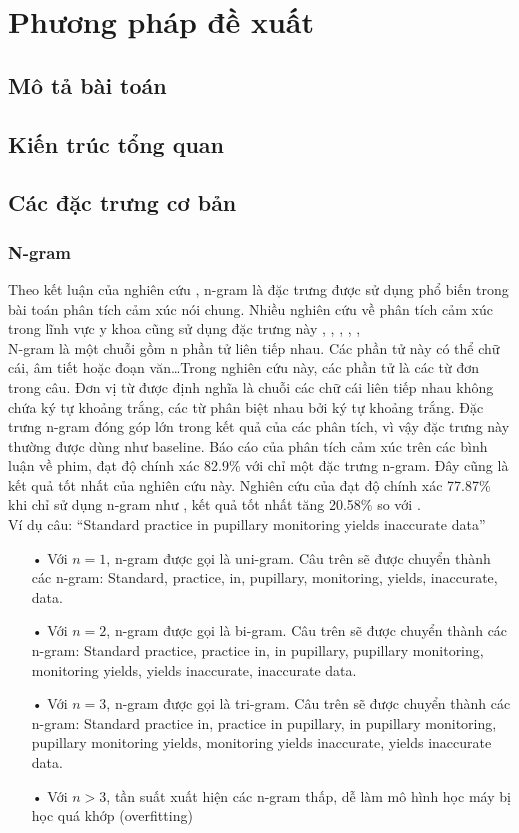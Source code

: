 \section{Phương pháp đề xuất}
\subsection{Mô tả bài toán}
\subsection{Kiến trúc tổng quan}
\subsection{Các đặc trưng cơ bản}
\subsubsection*{N-gram}
Theo kết luận của nghiên cứu \cite{chandrakala2012opinion}, n-gram là đặc trưng được sử dụng phổ biến trong bài toán phân tích cảm xúc nói chung. Nhiều nghiên cứu về phân tích cảm xúc trong lĩnh vực y khoa cũng sử dụng đặc trưng này \cite{pang2002thumbs}, \cite{niu2005analysis}, \cite{sarker2011outcome}, \cite{niu2006using}, \cite{pestian2012sentie}, \cite{xia09improving} \\

N-gram là một chuỗi gồm n phần tử liên tiếp nhau. Các phần tử này có thể chữ cái, âm tiết hoặc đoạn văn\ldots Trong nghiên cứu này, các phần tử là các từ đơn trong câu. Đơn vị từ được định nghĩa là chuỗi các chữ cái liên tiếp nhau không chứa ký tự khoảng trắng, các từ phân biệt nhau bởi ký tự khoảng trắng. Đặc trưng n-gram đóng góp lớn trong kết quả của các phân tích, vì vậy đặc trưng này thường được dùng như baseline. Báo cáo  của \cite{pang2002thumbs} phân tích cảm xúc trên các bình luận về phim, đạt độ chính xác 82.9\% với chỉ một đặc trưng n-gram. Đây cũng là kết quả tốt nhất của nghiên cứu này. Nghiên cứu của \cite{niu2005analysis} đạt độ chính xác 77.87\% khi chỉ sử dụng n-gram như , kết quả tốt nhất tăng 20.58\% so với . \\

Ví dụ câu: ``Standard practice in pupillary monitoring yields inaccurate data''
\begin{itemize}
\item[•]Với $n=1$, n-gram được gọi là uni-gram. Câu trên sẽ được chuyển thành các n-gram: Standard, practice, in, pupillary, monitoring, yields, inaccurate, data.
\item[•]Với $n=2$, n-gram được gọi là bi-gram. Câu trên sẽ được chuyển thành các n-gram: Standard practice, practice in, in pupillary, pupillary monitoring, monitoring yields, yields inaccurate, inaccurate data.
\item[•]Với $n=3$, n-gram được gọi là tri-gram. Câu trên sẽ được chuyển thành các n-gram: Standard practice in, practice in pupillary, in pupillary monitoring, pupillary monitoring yields, monitoring yields inaccurate, yields inaccurate data.
\item[•]Với $n>3$, tần suất xuất hiện các n-gram thấp, dễ làm mô hình học máy bị học quá khớp (overfitting)
\end{itemize}

